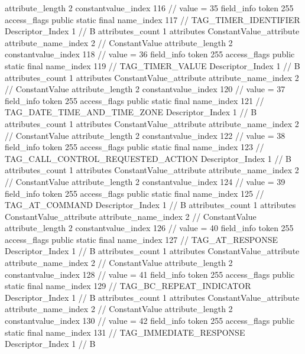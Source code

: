 {{{{{{{					attribute_length	2
					constantvalue_index	116		// value = 35
				}
				}
			}
			field_info {
				token	255
				access_flags	public static final
				name_index	117		// TAG_TIMER_IDENTIFIER
				Descriptor_Index	1		// B
				attributes_count	1
				attributes {
				ConstantValue_attribute {
					attribute_name_index	2		// ConstantValue
					attribute_length	2
					constantvalue_index	118		// value = 36
				}
				}
			}
			field_info {
				token	255
				access_flags	public static final
				name_index	119		// TAG_TIMER_VALUE
				Descriptor_Index	1		// B
				attributes_count	1
				attributes {
				ConstantValue_attribute {
					attribute_name_index	2		// ConstantValue
					attribute_length	2
					constantvalue_index	120		// value = 37
				}
				}
			}
			field_info {
				token	255
				access_flags	public static final
				name_index	121		// TAG_DATE_TIME_AND_TIME_ZONE
				Descriptor_Index	1		// B
				attributes_count	1
				attributes {
				ConstantValue_attribute {
					attribute_name_index	2		// ConstantValue
					attribute_length	2
					constantvalue_index	122		// value = 38
				}
				}
			}
			field_info {
				token	255
				access_flags	public static final
				name_index	123		// TAG_CALL_CONTROL_REQUESTED_ACTION
				Descriptor_Index	1		// B
				attributes_count	1
				attributes {
				ConstantValue_attribute {
					attribute_name_index	2		// ConstantValue
					attribute_length	2
					constantvalue_index	124		// value = 39
				}
				}
			}
			field_info {
				token	255
				access_flags	public static final
				name_index	125		// TAG_AT_COMMAND
				Descriptor_Index	1		// B
				attributes_count	1
				attributes {
				ConstantValue_attribute {
					attribute_name_index	2		// ConstantValue
					attribute_length	2
					constantvalue_index	126		// value = 40
				}
				}
			}
			field_info {
				token	255
				access_flags	public static final
				name_index	127		// TAG_AT_RESPONSE
				Descriptor_Index	1		// B
				attributes_count	1
				attributes {
				ConstantValue_attribute {
					attribute_name_index	2		// ConstantValue
					attribute_length	2
					constantvalue_index	128		// value = 41
				}
				}
			}
			field_info {
				token	255
				access_flags	public static final
				name_index	129		// TAG_BC_REPEAT_INDICATOR
				Descriptor_Index	1		// B
				attributes_count	1
				attributes {
				ConstantValue_attribute {
					attribute_name_index	2		// ConstantValue
					attribute_length	2
					constantvalue_index	130		// value = 42
				}
				}
			}
			field_info {
				token	255
				access_flags	public static final
				name_index	131		// TAG_IMMEDIATE_RESPONSE
				Descriptor_Index	1		// B
}}}}}
